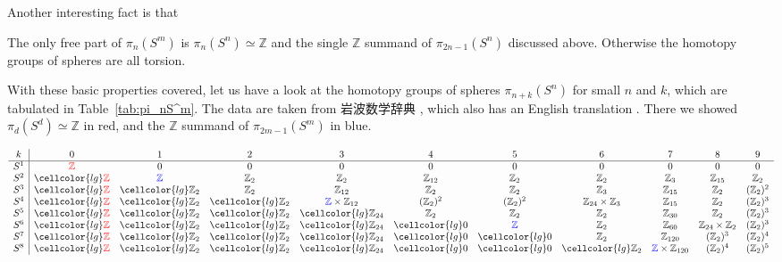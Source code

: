 \documentclass[12pt]{article}
\numberwithin{equation}{section}
\numberwithin{figure}{section}
\theoremstyle{remark}
\renewenvironment{table}[1][]{
  \begin{originaltable}[#1]
    \begin{mdframed}[linecolor=black!0,backgroundcolor=black!1]
}{
    \end{mdframed}
  \end{originaltable}
}
\def\bZ{\mathbb{Z}}
\begin{document}
Another interesting fact is that 

\begin{theorem}
  The only free part of $\pi_n(S^m)$ is $\pi_n(S^n)\simeq \bZ$
  and the single $\bZ$ summand of $\pi_{2n-1}(S^n)$ discussed above.
  Otherwise the homotopy groups of spheres are all torsion.
\end{theorem}
  

With these basic properties covered,
let us have a look at the homotopy groups of spheres $\pi_{n+k}(S^n)$ 
for small $n$ and $k$, which are tabulated in Table~\ref{tab:pi_nS^m}.
The data are taken from 岩波数学辞典 \cite[付録, 公式 7, V]{Jiten},
which also has an English translation \cite{EDM}.
There we showed $\pi_d(S^d)\simeq \bZ$ in red,
and the $\bZ$ summand of $\pi_{2m-1}(S^m)$ in blue.


\begin{table}[h]
  \[
\begin{array}{c|cccccccccccccccccc}
  k & 0 & 1 & 2 & 3 & 4 & 5 & 6 & 7 & 8 & 9  \\
   \hline
  S^1 & \textcolor{red}{\bZ} & 0 & 0 & 0 & 0 & 0 & 0 & 0 & 0 & 0 \\
  S^2 & \cellcolor{lg} \textcolor{red}{\bZ} & \textcolor{blue}{\bZ} & \bZ_2 & \bZ_2 & \bZ_{12} & \bZ_2 & \bZ_2 & \bZ_3 & \bZ_{15} & \bZ_2  \\
  S^3 & \cellcolor{lg} \textcolor{red}{\bZ} & \cellcolor{lg} \bZ_2 & \bZ_2 & \bZ_{12} & \bZ_2 & \bZ_2 & \bZ_3 & \bZ_{15} & \bZ_2 & (\bZ_2)^2  \\
  S^4 &\cellcolor{lg}  \textcolor{red}{\bZ} & \cellcolor{lg} \bZ_2 & \cellcolor{lg} \bZ_2 & \textcolor{blue}{\bZ} \times \bZ_{12} & (\bZ_2)^2 & (\bZ_2)^2 & \bZ_{24} \times \bZ_3 & \bZ_{15} & \bZ_2  & (\bZ_2)^3\\
  S^5 & \cellcolor{lg} \textcolor{red}{\bZ} & \cellcolor{lg} \bZ_2 & \cellcolor{lg} \bZ_2 & \cellcolor{lg} \bZ_{24} & \bZ_2 & \bZ_2 & \bZ_2 & \bZ_{30} & \bZ_2 & (\bZ_2)^3  \\
  S^6 & \cellcolor{lg} \textcolor{red}{\bZ} & \cellcolor{lg} \bZ_2 & \cellcolor{lg} \bZ_2 & \cellcolor{lg} \bZ_{24} & \cellcolor{lg} 0 & \textcolor{blue}{\bZ} & \bZ_2 & \bZ_{60} & \bZ_{24}\times \bZ_2 & (\bZ_2)^3\\
  S^7 &\cellcolor{lg}  \textcolor{red}{\bZ} & \cellcolor{lg} \bZ_2 & \cellcolor{lg} \bZ_2 & \cellcolor{lg}\bZ_{24} & \cellcolor{lg} 0 &\cellcolor{lg}  0 & \bZ_2 & \bZ_{120} & (\bZ_2)^3 & (\bZ_2)^4 \\
  S^8 & \cellcolor{lg} \textcolor{red}{\bZ} & \cellcolor{lg} \bZ_2 & \cellcolor{lg} \bZ_2 & \cellcolor{lg} \bZ_{24} & \cellcolor{lg} 0 & \cellcolor{lg} 0 & \cellcolor{lg} \bZ_2 & \textcolor{blue}{\bZ}\times \bZ_{120} & (\bZ_2)^4 & (\bZ_2)^5 \\

\end{array}\]
\end{table}
\end{document}

